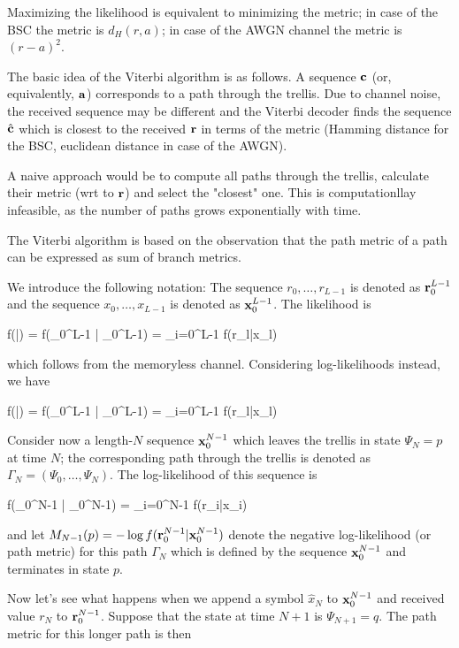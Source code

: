 Maximizing the likelihood is equivalent to minimizing the metric; in case of the BSC the metric is $d_H(r,a)$; in case of the AWGN channel the metric is $(r-a)^2$.

The basic idea of the Viterbi algorithm is as follows. A sequence $\mathbf{c}$ (or, equivalently, $\mathbf{a}$) corresponds to a path through the trellis. Due to channel noise, the received sequence may be different and the Viterbi decoder finds the sequence $\hat{\mathbf{c}}$ which is closest to the received $\mathbf{r}$ in terms of the metric (Hamming distance for the BSC, euclidean distance in case of the AWGN).

A naive approach would be to compute all paths through the trellis, calculate their metric (wrt to $\mathbf{r}$) and select the "closest" one. This is computationllay infeasible, as the number of paths grows exponentially with time.

The Viterbi algorithm is based on the observation that the path metric of a path can be expressed as sum of branch metrics. 

We introduce the following notation: The sequence $r_0,\ldots,r_{L-1}$ is denoted as $\mathbf{r}_{0}^{L-1}$ and the sequence $x_0,\ldots,x_{L-1}$ is denoted as $\mathbf{x}_{0}^{L-1}$. The likelihood is

\bee
f(\rbf|\xbf) = f(\rbf_{0}^{L-1} | \rbf_{0}^{L-1}) = \prod_{i=0}^{L-1} f(r_l|x_l)
\eee

which follows from the memoryless channel. Considering log-likelihoods instead, we have

\bee
\log f(\rbf|\xbf) = \log f(\rbf_{0}^{L-1} | \rbf_{0}^{L-1}) = \sum_{i=0}^{L-1} \log f(r_l|x_l)
\eee

Consider now a length-$N$ sequence $\mathbf{x}_{0}^{N-1}$ which leaves the trellis in state $\Psi_N = p$ at time $N$; the corresponding path through the trellis is denoted as $\Gamma_N = (\Psi_0,\ldots,\Psi_N)$. The log-likelihood of this sequence is

\bee
\log f(\rbf_{0}^{N-1} | \xbf_{0}^{N-1}) = \sum_{i=0}^{N-1} \log f(r_i|x_i)
\eee

and let $M_{N-1}(p) = -\log f(\mathbf{r}_{0}^{N-1} | \mathbf{x}_{0}^{N-1})$ denote the negative log-likelihood (or path metric) for this path $\Gamma_N$ which is defined by the sequence $\mathbf{x}_{0}^{N-1}$ and terminates in state $p$. 

Now let's see what happens when we append a symbol $\hat x_N$ to $\mathbf{x}_{0}^{N-1}$ and received value $r_N$ to $\mathbf{r}_{0}^{N-1}$. Suppose that the state at time $N+1$ is $\Psi_{N+1} = q$. The path metric for this longer path is then

